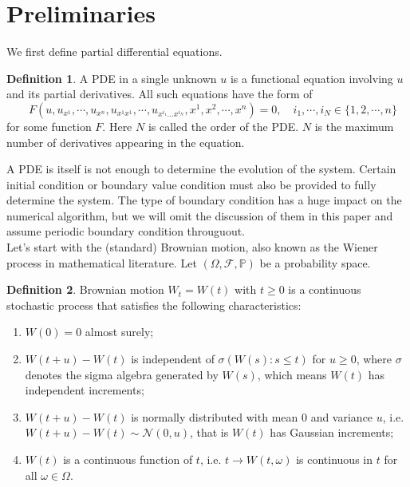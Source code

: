\documentclass[11pt]{article}
\theoremstyle{definition}
\newtheorem{definition}{Definition}
\begin{document}
\section{Preliminaries}\label{sec:prelim}
We first define partial differential equations.
\begin{definition}
 A PDE\cite{evans_partial_1998} in a single unknown $u$ is a functional equation involving $u$ and its partial derivatives. All such equations have the form of
$$\quad F\left(u, u_{x^1}, \cdots, u_{x^n}, u_{x^1 x^1}, \cdots, u_{x^{i_1} \ldots x^{i_N}}, x^1, x^2, \cdots, x^n\right)=0, \quad i_1, \cdots, i_N \in\{1,2, \cdots, n\}
$$ 
for some function $F$.
Here $N$ is called the order of the PDE. $N$ is the maximum number of derivatives appearing in the equation.    
\end{definition}
A PDE is itself is not enough to determine the evolution of the system. Certain initial condition or boundary value condition must also be provided to fully determine the system. The type of boundary condition has a huge impact on the numerical algorithm, but we will omit the discussion of them in this paper and assume periodic boundary condition througuout.\\

Let's start with the (standard) Brownian motion, also known as the Wiener process in mathematical literature. Let $\left( \Omega,\mathcal{F},\mathbb{P}\right)$ be a probability space.
\begin{definition}
Brownian motion $W_t=W(t)$ with $t \geq 0$ is a continuous stochastic process that satisfies the following characteristics:\\
\begin{enumerate}
    \item $W(0)=0$ almost surely;
    \item $W(t+u)-W(t)$ is independent of $\sigma(W(s): s \leq t)$ for $u \geq 0$, where $\sigma$ denotes the sigma algebra generated by $W(s)$, which means $W(t)$ has independent increments;
    \item $W(t+u)-W(t)$ is normally distributed with mean 0 and variance $u$, i.e. $W(t+u)-W(t) \sim \mathcal{N}(0, u)$, that is $W(t)$ has Gaussian increments;
    \item $W(t)$ is a continuous function of $t$, i.e. $t \rightarrow W(t, \omega)$ is continuous in $t$ for all $\omega \in \Omega$.
\end{enumerate}

\end{definition}
\end{document}
